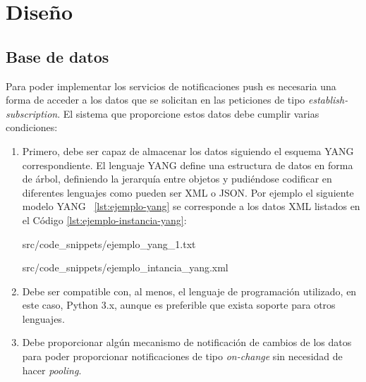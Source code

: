 \chapter{Diseño\label{sec:disenho}}

\section{Base de datos}
Para poder implementar los servicios de notificaciones push es necesaria una forma de acceder a los
datos que se solicitan en las peticiones de tipo \textit{establish-subscription}. El sistema que 
proporcione estos datos debe cumplir varias condiciones:

\begin{enumerate}
    \item Primero, debe ser capaz de almacenar los datos siguiendo el esquema YANG correspondiente. 
    El lenguaje YANG define una estructura de datos en forma de árbol, definiendo la jerarquía entre
    objetos y pudiéndose codificar en diferentes lenguajes como pueden ser \gls{XML} o \gls{JSON}.
    Por ejemplo el siguiente modelo YANG ~\ref{lst:ejemplo-yang} se corresponde a los datos \gls{XML}
    listados en el Código \ref{lst:ejemplo-instancia-yang}:
    
    
                        {src/code_snippets/ejemplo_yang_1.txt}
                        
    
                        {src/code_snippets/ejemplo_intancia_yang.xml}

    \item Debe ser compatible con, al menos, el lenguaje de programación utilizado, en este caso,
    Python 3.x, aunque es preferible que exista soporte para otros lenguajes.
    
    \item Debe proporcionar algún mecanismo de notificación de cambios de los datos para poder
    proporcionar notificaciones de tipo \textit{on-change} sin necesidad de hacer \textit{pooling}.
\end{enumerate}

